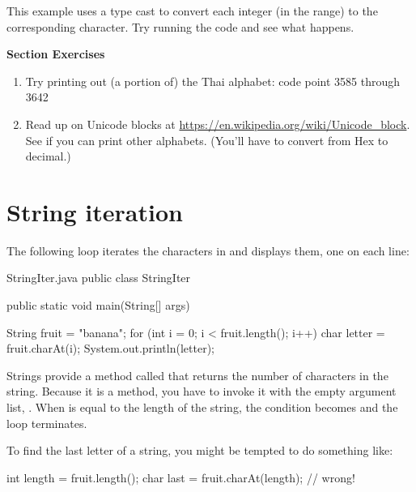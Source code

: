 This example uses a type cast to convert each integer (in the range) to the corresponding character.
Try running the code and see what happens.

\textbf{Section Exercises}
\begin{enumerate}
\item Try printing out (a portion of) the Thai alphabet:  code point 3585 through 3642
\item Read up on Unicode blocks at \url{https://en.wikipedia.org/wiki/Unicode_block}.  See if you can print other alphabets.  (You'll have to convert from Hex to decimal.)
\end{enumerate}

\section{String iteration}


The following loop iterates the characters in  and displays them, one on each line:

\begin{trinket} [210] {StringIter.java}
public class StringIter {
    public static void main(String[] args) {
       
       String fruit = "banana";
       for (int i = 0; i < fruit.length(); i++) {
          char letter = fruit.charAt(i);
          System.out.println(letter);
       }
    }
}
\end{trinket}

Strings provide a method called  that returns the number of characters in the string.
Because it is a method, you have to invoke it with the empty argument list, \java{()}.
When  is equal to the length of the string, the condition becomes  and the loop terminates.

To find the last letter of a string, you might be tempted to do something like:

\begin{code}
int length = fruit.length();
char last = fruit.charAt(length);      // wrong!
\end{code}

